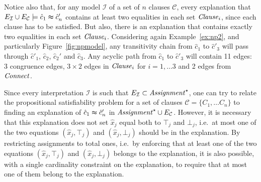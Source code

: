\documentclass[a4paper,11pt]{article}
\begin{document}
\noindent Notice also that, for any model $\mathcal{I}$ of a set of $n$ clauses
$\mathcal{C}$, every explanation that $E_{\mathcal{I}} \cup E_\mathcal{C}
\models \hat{c}_1 \thickapprox \hat{c}_n'$ contains at least two equalities in
each set ${\it Clause}_i$, since each clause has to be satisfied.  But also, there is
an explanation that contains exactly two equalities in each set ${\it Clause}_i$.
Considering again Example~\ref{ex:np2}, and particularly
Figure~\ref{fig:npmodel}, any transitivity chain from $\hat{c}_1$ to
$\hat{c}'_3$ will pass through $\hat{c}'_1$, $\hat{c}_2$, $\hat{c}_2'$ and
$\hat{c}_3$.  Any acyclic path from $\hat{c}_1$ to $\hat{c}'_3$ will contain 11
edges: 3 congruence edges, $3\times 2$ edges in ${\it Clause}_i$ for $i=1,\dots 3$
and 2 edges from ${\it Connect}$.

Since every interpretation $\mathcal{I}$ is such that $E_{\mathcal{I}} \subset
{\it Assignment}^\star$, one can try to relate the propositional satisfiability
problem for a set of clauses $\mathcal{C}= \{C_1, \dots C_n\}$ to finding an
explanation of $\hat{c}_1 \thickapprox \hat{c}_n'$ in ${\it Assignment}^\star \cup
E_{\mathcal{C}}$.  However, it is necessary that this explanation does not set
$\hat{x}_j$ equal both to $\top_j$ and $\bot_j$, i.e.\ at most one of the two
equations $(\hat{x}_j,\top_j)$ and $(\hat{x}_j,\bot_j)$ should be in the
explanation.  By restricting assignments to total ones, i.e.\ by enforcing that
at least one of the two equations $(\hat{x}_j,\top_j)$ and $(\hat{x}_j,\bot_j)$
belongs to the explanation, it is also possible, with a single cardinality
constraint on the explanation, to require that at most one of them belong to the
explanation.

\end{document}

